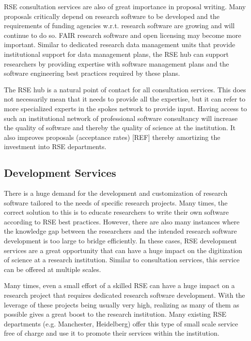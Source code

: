 \documentclass[a4paper]{article}
\makeatletter
\newcommand*{\eg}{e.g.\@\xspace}
\makeatother
\begin{document}
RSE consultation services are also of great importance in proposal writing.
Many proposals critically depend on research software to be developed and the requirements of funding agencies w.r.t. research software are growing and will continue to do so.
FAIR research software and open licensing may become more important.
Similar to dedicated research data management units that provide institutional support for data management plans,
the RSE hub can support researchers by providing expertise with software management plans and the software engineering best practices required by these plans.

The RSE hub is a natural point of contact for all consultation services.
This does not necessarily mean that it needs to provide all the expertise, but it can refer to more specialized experts in the spokes network to provide input.
Having access to such an institutional network of professional software consultancy will increase the quality of software and thereby the quality of science at the institution.
It also improves proposals (acceptance rates) [REF] thereby amortizing the investment into RSE departments.

\subsection{Development Services}
\label{sec:development}

There is a huge demand for the development and customization of research software tailored to the needs of specific research projects.
Many times, the correct solution to this is to educate researchers to write their own software according to RSE best practices.
However, there are also many instances where the knowledge gap between the researchers and the intended research software development is too large to bridge efficiently.
In these cases, RSE development services are a great opportunity that can have a huge impact on the digitization of science at a research institution.
Similar to consultation services, this service can be offered at multiple scales.

Many times, even a small effort of a skilled RSE can have a huge impact on a research project that requires dedicated research software development.
With the leverage of these projects being usually very high, realizing as many of them as possible gives a great boost to the research institution.
Many existing RSE departments (\eg Manchester, Heidelberg) offer this type of small scale service free of charge and use it to promote their services within the institution.
\end{document}
